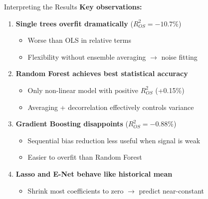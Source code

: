 \documentclass[10pt]{beamer}
\newcommand{\highlight}[1]{\textcolor{AccentOrange}{\textbf{#1}}}
\begin{document}
\begin{frame}{Interpreting the Results}
  \textbf{Key observations:}

  \vspace{0.5em}
  \begin{enumerate}
    \item \highlight{Single trees overfit dramatically} ($R^2_{OS} = -10.7\%$)
    \begin{itemize}
      \item Worse than OLS in relative terms
      \item Flexibility without ensemble averaging $\to$ noise fitting
    \end{itemize}

    \vspace{0.3em}
    \item \highlight{Random Forest achieves best statistical accuracy}
    \begin{itemize}
      \item Only non-linear model with positive $R^2_{OS}$ (+0.15\%)
      \item Averaging + decorrelation effectively controls variance
    \end{itemize}

    \vspace{0.3em}
    \item \highlight{Gradient Boosting disappoints} ($R^2_{OS} = -0.88\%$)
    \begin{itemize}
      \item Sequential bias reduction less useful when signal is weak
      \item Easier to overfit than Random Forest
    \end{itemize}

    \vspace{0.3em}
    \item \highlight{Lasso and E-Net behave like historical mean}
    \begin{itemize}
      \item Shrink most coefficients to zero $\to$ predict near-constant
    \end{itemize}
  \end{enumerate}
\end{frame}

\end{document}

